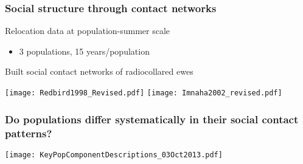 \documentclass[fleqn,xcolor=table]{beamer}
\begin{document}
\begin{frame}[t]
\frametitle{\color{darkred} Social structure through contact networks}
	\begin{itemize}
		{\small
		\item \color{navy} Relocation data at population-summer scale 
			\begin{itemize}
				\item[] \color{navy} {\footnotesize 3 populations, 15
					years/population}
			\end{itemize}
		\item \color{navy} Built social contact networks of radiocollared ewes
		}
	\end{itemize}
	\vspace{.3in}
%
	\texttt{[image: Redbird1998\_Revised.pdf]}
	\hspace{.15in}
	\texttt{[image: Imnaha2002\_revised.pdf]}
\end{frame}

\begin{frame}[t]
\frametitle{\color{darkred} Do populations differ systematically in their social contact
patterns?}
\vspace{.2in}

	\texttt{[image: KeyPopComponentDescriptions\_03Oct2013.pdf]}

\end{frame}
\end{document}
